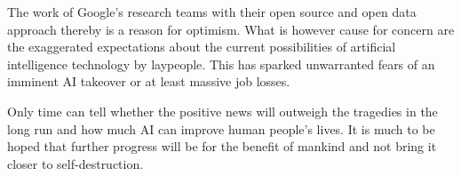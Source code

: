 The work of Google's research teams with their open source and open data approach thereby is a reason for optimism. What is however cause for concern are the 	exaggerated expectations about the current possibilities of artificial intelligence technology by laypeople. This has sparked unwarranted fears of an imminent AI takeover or at least massive job losses.

Only time can tell whether the positive news will outweigh the tragedies in the long run and how much AI can improve human people's lives. It is much to be hoped that further progress will be for the benefit of mankind and not bring it closer to self-destruction.






